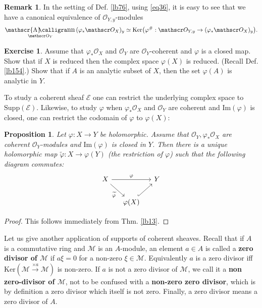 \documentclass[12pt,b5paper,notitlepage]{report}
\theoremstyle{definition}
\newtheorem{exe}[df]{Exercise}
\newtheorem{rem}[df]{Remark}
\theoremstyle{plain}
\newtheorem{pp}[df]{Proposition}
\DeclareMathOperator{\sann}{\mathscr{A}\text{\kern -3pt {\calligra\large nn}}\,}
\newcommand{\mc}{\mathcal}
\newcommand{\wtd}{\widetilde}
\newcommand{\scr}{\mathscr}
\newcommand{\Ker}{\mathrm{Ker}}
\newcommand{\Imag}{\mathrm{Im}}
\newcommand{\Supp}{\mathrm{Supp}}
\numberwithin{equation}{section}
\begin{document}
\begin{rem}\label{lb229}
In the setting of Def. \ref{lb76}, using \eqref{eq36}, it is easy to see that we have a canonical equivalence of $\scr O_{Y,y}$-modules
\begin{align}
\sann_{\scr O_Y}(\varphi_*\scr O_X)_y\simeq \Ker\big(\varphi^\#:\scr O_{Y,y}\rightarrow(\varphi_*\scr O_X)_y\big).\label{eq37}
\end{align}
\end{rem}


\begin{exe}\label{lb155}
Assume that $\varphi_*\scr O_X$ and $\scr O_Y$ are $\scr O_Y$-coherent and $\varphi$ is a closed map. Show that if $X$ is reduced then the complex space $\varphi(X)$ is reduced. (Recall Def. \ref{lb154}.) Show that if $A$ is an analytic subset of $X$, then the set $\varphi(A)$ is analytic in $Y$. 
\end{exe}



To study a coherent sheaf $\scr E$ one can restrict the underlying complex space to $\Supp(\scr E)$. Likewise, to study $\varphi$ when $\varphi_*\scr O_X$ and $\scr O_Y$ are coherent and $\Imag(\varphi)$ is closed, one can restrict the codomain of $\varphi$ to $\varphi(X)$:

\begin{pp}\label{lb77}
Let $\varphi:X\rightarrow Y$ be holomorphic. Assume that $\scr O_Y,\varphi_*\scr O_X$ are coherent $\scr O_Y$-modules and $\Imag(\varphi)$ is closed in $Y$. Then there is a unique holomorphic map $\wtd\varphi:X\rightarrow\varphi(Y)$ (the restriction of $\varphi$) such that the following diagram commutes:
\begin{equation*}
\begin{tikzcd}[column sep=small]
X \arrow[rr, "\varphi"] \arrow[rd, "\wtd\varphi"'] &                             & Y \\
                                                   & \varphi(X) \arrow[ru, hook] &  
\end{tikzcd}
\end{equation*}
\end{pp}

\begin{proof}
This follows immediately from Thm. \ref{lb13}.
\end{proof}


Let us give another application of supports of coherent sheaves. Recall that if $A$ is a commutative ring and $\mc M$ is an $A$-module, an element $a\in A$ is called a \textbf{zero divisor of $\mc M$}  if $a\xi=0$ for a non-zero $\xi\in\mc M$. Equivalently $a$ is a zero divisor iff $\Ker(\mc M\xrightarrow{\times a}\mc M)$ is non-zero. If $a$ is not a zero divisor of $\mc M$, we call it a \textbf{non zero-divisor of $\mc M$}, not to be confused with a \textbf{non-zero zero divisor}, which is by definition a zero divisor which itself is not zero. Finally, a zero divisor means a zero divisor of $A$.
\end{document}
